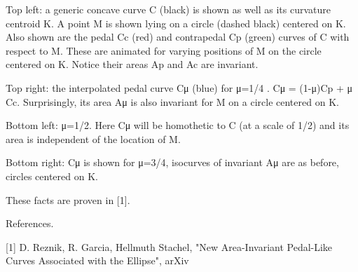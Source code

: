 Top left: a generic concave curve C (black) is shown as well as its curvature centroid K. A point M is shown lying on a circle (dashed black) centered on K. Also shown are the pedal Cc (red) and contrapedal Cp (green) curves of C with respect to M. These are animated for varying positions of M on the circle centered on K. Notice their areas Ap and Ac are invariant.

Top right: the interpolated pedal curve Cμ (blue) for μ=1/4 . Cμ = (1-μ)Cp + μ Cc. Surprisingly, its area Aμ is also invariant for M on a circle centered on K.

Bottom left: μ=1/2. Here Cμ will be homothetic to C (at a scale of 1/2) and its area is independent of the location of M.

Bottom right: Cμ is shown for μ=3/4, isocurves of invariant Aμ are as before, circles centered on K.

These facts are proven in [1].

References.

[1] D. Reznik, R. Garcia, Hellmuth Stachel, "New Area-Invariant Pedal-Like Curves Associated with the Ellipse", arXiv